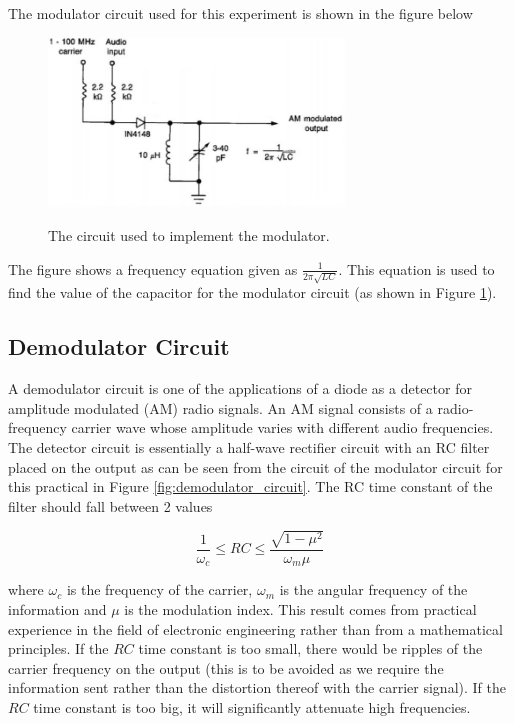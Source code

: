 \documentclass[12pt, a4paper]{article}
\begin{document}
		The modulator circuit used for this experiment is shown in the figure below

		\begin{figure}[H]
			\centering
			\includegraphics[width=0.7\textwidth]{images/modulator_circuit.png}
			\label{fig:modulator_circuit}
			\caption{The circuit used to implement the modulator.}
		\end{figure}

		The figure shows a frequency equation given as $\frac{1}{2\pi\sqrt{LC}}$. This equation is used to find the value of the capacitor for the modulator circuit (as shown in Figure \ref{fig:modulator_circuit}).
	\subsection{Demodulator Circuit}

		A demodulator circuit is one of the applications of a diode as a detector for amplitude modulated (AM) radio signals. An AM signal consists of a radio-frequency carrier wave whose amplitude varies with different audio frequencies. The detector circuit is essentially a half-wave rectifier circuit with an RC filter placed on the output as can be seen from the circuit of the modulator circuit for this practical in Figure \ref{fig:demodulator_circuit}. The RC time constant of the filter should fall between 2 values

		\begin{equation}
			\label{eqn:time_const_demodulator_circuit}
			\frac{1}{\omega_c} \le RC \le \frac{\sqrt{1-\mu^2}}{\omega_m\mu}
		\end{equation}

		where $\omega_c$ is the frequency of the carrier, $\omega_m$ is the angular frequency of the information and $\mu$ is the modulation index. This result comes from practical experience in the field of electronic engineering rather than from a mathematical principles. If the $RC$ time constant is too small, there would be ripples of the carrier frequency on the output (this is to be avoided as we require the information sent rather than the distortion thereof with the carrier signal). If the $RC$ time constant is too big, it will significantly attenuate high frequencies.
\end{document}
